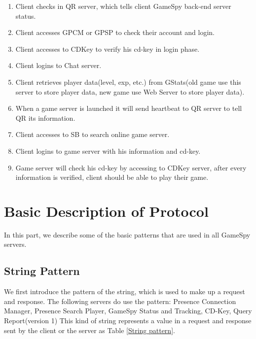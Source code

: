 \documentclass[oneside,titlepage,a4paper]{Definition/retrospy} %
\begin{document}
\begin{enumerate}
	\item Client checks in QR server, which tells client GameSpy back-end server status.
	\item Client accesses GPCM or GPSP to check their account and login.
	\item Client accesses to CDKey to verify his cd-key in login phase.
	\item Client logins to Chat server.
	\item Client retrieves player data(level, exp, etc.) from GStats(old game use this server to store player data, new game use Web Server to store player data).
	\item When a game server is launched it will send heartbeat to QR server to tell QR its information.
	\item Client accesses to SB to search online game server.
	\item Client logins to game server with his information and cd-key.
	\item Game server will check his cd-key by accessing to CDKey server, after every information is verified, client should be able to play their game.
\end{enumerate}


\chapter{Basic Description of Protocol}
In this part, we describe some of the basic patterns that are used in all GameSpy servers.

\section{String Pattern}
We first introduce the pattern of the string, which is used to make up a request and response.
The following servers do use the pattern: Presence Connection Manager, Presence Search Player, GameSpy Status and Tracking, CD-Key, Query Report(version 1)
This kind of string represents a value in a request and response sent by the client or the server as Table \ref{String pattern}.\\
\end{document}
